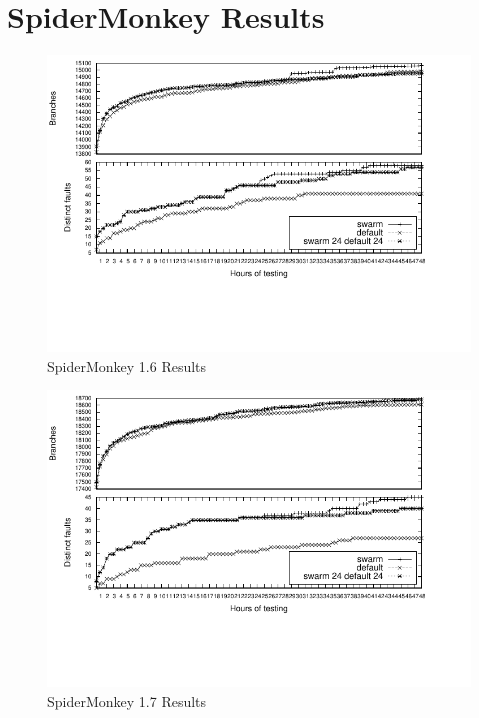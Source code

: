 \section{SpiderMonkey Results}

\begin{figure}[t]
  \centering
  \includegraphics[width=\textwidth]{../graphs/SpiderMonkey/js16}
  \vspace{-1.3in}
  \caption{SpiderMonkey 1.6 Results}
  \label{fig:smonkey16}
\end{figure}

\begin{figure}
  \centering
  \includegraphics[width=\textwidth]{../graphs/SpiderMonkey/js17}
  \vspace{-1.5in}
  \caption{SpiderMonkey 1.7 Results}
  \label{fig:smonkey17}
\end{figure}

